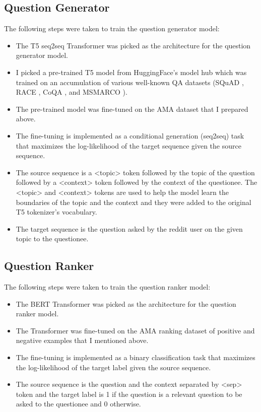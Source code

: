 \documentclass[paper=a4, fontsize=11pt]{scrartcl}
\numberwithin{equation}{section}		%
\numberwithin{figure}{section}			%
\numberwithin{table}{section}				%
\begin{document}
\subsection{Question Generator}
The following steps were taken to train the question generator model:
\begin{itemize}
  \item The T5 seq2seq Transformer \cite{raffel2020exploring} was picked as the architecture for the question generator model.
  \item I picked a pre-trained T5 model from HuggingFace's model hub which was trained on an accumulation of various well-known QA datasets (SQuAD \cite{rajpurkar2016squad}, RACE \cite{lai2017race}, CoQA \cite{reddy2019coqa}, and MSMARCO \cite{nguyen2016ms}).
  \item The pre-trained model was fine-tuned on the AMA dataset that I prepared above.
  \item The fine-tuning is implemented as a conditional generation (seq2seq) task that maximizes the log-likelihood of the target sequence given the source sequence.
  \item The source sequence is a <topic> token followed by the topic of the question followed by a <context> token followed by the context of the questionee. The <topic> and <context> tokens are used to help the model learn the boundaries of the topic and the context and they were added to the original T5 tokenizer's vocabulary.
  \item The target sequence is the question asked by the reddit user on the given topic to the questionee.
\end{itemize}

\subsection{Question Ranker}
The following steps were taken to train the question ranker model:
\begin{itemize}
  \item The BERT Transformer \cite{devlin2018bert} was picked as the architecture for the question ranker model.
  \item The Transformer was fine-tuned on the AMA ranking dataset of positive and negative examples that I mentioned above.
  \item The fine-tuning is implemented as a binary classification task that maximizes the log-likelihood of the target label given the source sequence.
  \item The source sequence is the question and the context separated by <sep> token and the target label is 1 if the question is a relevant question to be asked to the questionee and 0 otherwise.
\end{itemize}
\end{document}
